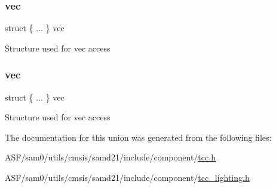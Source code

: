 \subsubsection{\texorpdfstring{vec}{vec}\hspace{0.1cm}{\footnotesize\ttfamily [1/2]}}
{\footnotesize\ttfamily struct \{ ... \}   vec}

Structure used for vec access \mbox{\label{union_t_c_c___i_n_t_f_l_a_g___type_a8d1fb9a4f824e434d0da198c8b53a10e}} 
\subsubsection{\texorpdfstring{vec}{vec}\hspace{0.1cm}{\footnotesize\ttfamily [2/2]}}
{\footnotesize\ttfamily struct \{ ... \}   vec}

Structure used for vec access 

The documentation for this union was generated from the following files\+:\begin{DoxyCompactItemize}
\item 
A\+S\+F/sam0/utils/cmsis/samd21/include/component/\mbox{\hyperlink{tcc_8h}{tcc.\+h}}\item 
A\+S\+F/sam0/utils/cmsis/samd21/include/component/\mbox{\hyperlink{tcc__lighting_8h}{tcc\+\_\+lighting.\+h}}\end{DoxyCompactItemize}
